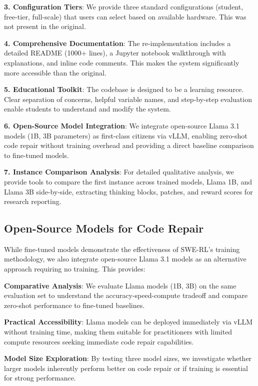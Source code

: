 \documentclass{article} %
\begin{document}
\textbf{3. Configuration Tiers}: We provide three standard configurations (student, free-tier, full-scale) that users can select based on available hardware. This was not present in the original.

\textbf{4. Comprehensive Documentation}: The re-implementation includes a detailed README (1000+ lines), a Jupyter notebook walkthrough with explanations, and inline code comments. This makes the system significantly more accessible than the original.

\textbf{5. Educational Toolkit}: The codebase is designed to be a learning resource. Clear separation of concerns, helpful variable names, and step-by-step evaluation enable students to understand and modify the system.

\textbf{6. Open-Source Model Integration}: We integrate open-source Llama 3.1 models (1B, 3B parameters) as first-class citizens via vLLM, enabling zero-shot code repair without training overhead and providing a direct baseline comparison to fine-tuned models.

\textbf{7. Instance Comparison Analysis}: For detailed qualitative analysis, we provide tools to compare the first instance across trained models, Llama 1B, and Llama 3B side-by-side, extracting thinking blocks, patches, and reward scores for research reporting.

\subsection{Open-Source Models for Code Repair}

While fine-tuned models demonstrate the effectiveness of SWE-RL's training methodology, we also integrate open-source Llama 3.1 models \citep{meta2024llama3} as an alternative approach requiring no training. This provides:

\textbf{Comparative Analysis}: We evaluate Llama models (1B, 3B) on the same evaluation set to understand the accuracy-speed-compute tradeoff and compare zero-shot performance to fine-tuned baselines.

\textbf{Practical Accessibility}: Llama models can be deployed immediately via vLLM without training time, making them suitable for practitioners with limited compute resources seeking immediate code repair capabilities.

\textbf{Model Size Exploration}: By testing three model sizes, we investigate whether larger models inherently perform better on code repair or if training is essential for strong performance.
\end{document}
